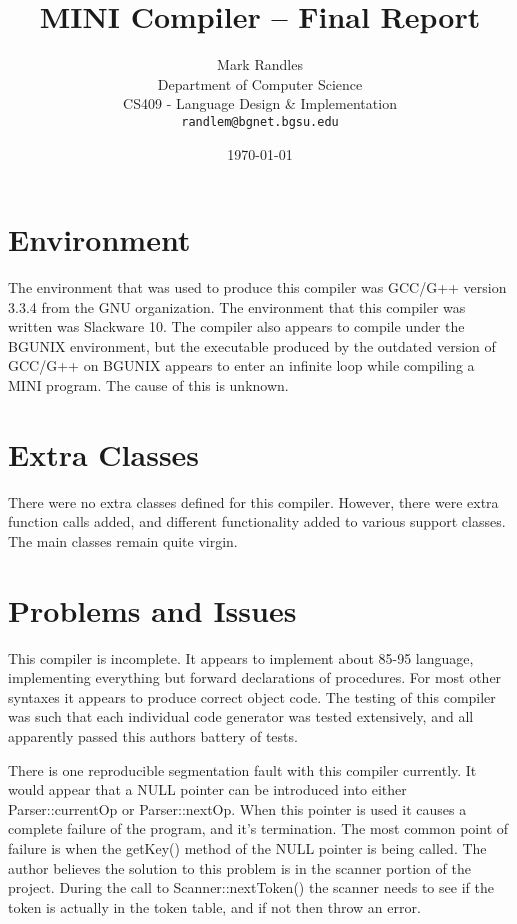 \documentclass[english]{article}
\begin{document}
\title{MINI Compiler -- Final Report}
\author{Mark Randles\\
		Department of Computer Science\\
		CS409 - Language Design \& Implementation\\
  \texttt{randlem@bgnet.bgsu.edu}}
\date{\today}
\maketitle

\section{Environment}

The environment that was used to produce this compiler was GCC/G++ version 3.3.4
from the GNU organization.  The environment that this compiler was written was
Slackware 10.  The compiler also appears to compile under the BGUNIX environment,
but the executable produced by the outdated version of GCC/G++ on BGUNIX appears
to enter an infinite loop while compiling a MINI program.  The cause of this is
unknown.

\section{Extra Classes}

There were no extra classes defined for this compiler.  However, there were extra
function calls added, and different functionality added to various support classes.
The main classes remain quite virgin.

\section{Problems and Issues}

This compiler is incomplete.  It appears to implement about 85-95%
language, implementing everything but forward declarations of procedures.  For most
other syntaxes it appears to produce correct object code.  The testing of this compiler
was such that each individual code generator was tested extensively, and all apparently
passed this authors battery of tests.

There is one reproducible segmentation fault with this compiler currently.  It would
appear that a NULL pointer can be introduced into either Parser::currentOp or
Parser::nextOp.  When this pointer is used it causes a complete failure of the
program, and it's termination.  The most common point of failure is when the
getKey() method of the NULL pointer is being called.  The author believes the
solution to this problem is in the scanner portion of the project.  During the
call to Scanner::nextToken() the scanner needs to see if the token is actually
in the token table, and if not then throw an error.
\end{document}
